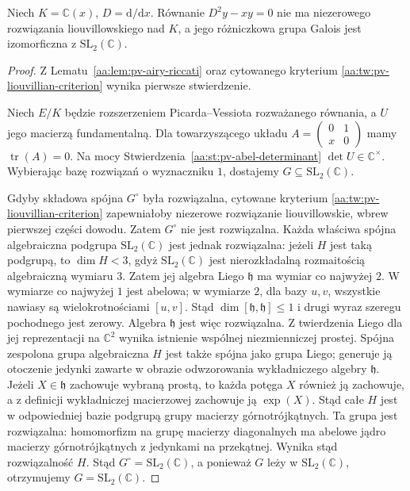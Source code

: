 \begin{twierdzenie}
\label{aa:tw:pv-airy-group}
Niech $K=\mathbb C(x)$,
$D=\mathrm d/\mathrm dx$.
Równanie $D^2y-xy=0$
nie ma niezerowego rozwiązania
liouvillowskiego nad $K$,
a jego różniczkowa grupa
Galois jest izomorficzna
z $\mathrm{SL}_2(\mathbb C)$.
\end{twierdzenie}
\begin{proof}
Z Lematu~\ref{aa:lem:pv-airy-riccati}
oraz cytowanego kryterium
\ref{aa:tw:pv-liouvillian-criterion}
wynika pierwsze stwierdzenie.

Niech $E/K$ będzie rozszerzeniem
Picarda--Vessiota rozważanego
równania, a $U$ jego macierzą
fundamentalną. Dla towarzyszącego
układu $A=\left(\begin{smallmatrix}
0&1\\x&0\end{smallmatrix}\right)$
mamy $\operatorname{tr}(A)=0$.
Na mocy
Stwierdzenia~\ref{aa:st:pv-abel-determinant}
$\det U\in\mathbb C^\times$.
Wybierając bazę rozwiązań
o wyznaczniku $1$, dostajemy
$G\subseteq\mathrm{SL}_2(\mathbb C)$.

Gdyby składowa spójna
$G^\circ$ była rozwiązalna,
cytowane kryterium
\ref{aa:tw:pv-liouvillian-criterion}
zapewniałoby niezerowe
rozwiązanie liouvillowskie,
wbrew pierwszej części dowodu.
Zatem $G^\circ$ nie jest
rozwiązalna.
Każda właściwa spójna
algebraiczna podgrupa
$\mathrm{SL}_2(\mathbb C)$
jest jednak rozwiązalna:
jeżeli $H$ jest taką podgrupą, to
$\dim H<3$, gdyż $\mathrm{SL}_2(\mathbb C)$ jest
nierozkładalną rozmaitością algebraiczną wymiaru $3$.
Zatem jej algebra Liego $\mathfrak h$ ma wymiar co najwyżej
$2$. W wymiarze co najwyżej $1$ jest abelowa;
w wymiarze $2$, dla bazy $u,v$, wszystkie nawiasy
są wielokrotnościami $[u,v]$. Stąd
$\dim[\mathfrak h,\mathfrak h]\le1$ i drugi wyraz
szeregu pochodnego jest zerowy.
Algebra $\mathfrak h$ jest więc rozwiązalna.
Z twierdzenia Liego dla jej reprezentacji na $\mathbb C^2$
wynika istnienie wspólnej niezmienniczej prostej.
Spójna zespolona grupa algebraiczna $H$ jest także
spójna jako grupa Liego; generuje ją otoczenie
jedynki zawarte w obrazie odwzorowania wykładniczego
algebry $\mathfrak h$. Jeżeli $X\in\mathfrak h$ zachowuje
wybraną prostą, to każda potęga $X$ również ją zachowuje,
a z definicji wykładniczej macierzowej zachowuje ją
$\exp(X)$. Stąd całe $H$
jest w odpowiedniej bazie podgrupą grupy macierzy
górnotrójkątnych. Ta grupa jest rozwiązalna: homomorfizm
na grupę macierzy diagonalnych ma abelowe jądro
macierzy górnotrójkątnych z jedynkami na przekątnej.
Wynika stąd rozwiązalność $H$.
Stąd $G^\circ=\mathrm{SL}_2(\mathbb C)$,
a ponieważ $G$ leży
w $\mathrm{SL}_2(\mathbb C)$,
otrzymujemy
$G=\mathrm{SL}_2(\mathbb C)$.
\end{proof}


